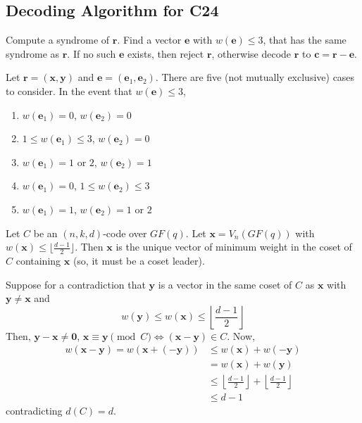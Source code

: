 \subsection*{Decoding Algorithm for C24}
Compute a syndrome of $ \symbf{r} $. Find a vector $ \symbf{e} $ with $ w(\symbf{e})\leqslant 3 $,
that has the same syndrome as $ \symbf{r} $. If no such $ \symbf{e} $ exists, then
reject $ \symbf{r} $, otherwise decode $ \symbf{r} $ to $ \symbf{c}=\symbf{r}-\symbf{e} $.

Let $ \symbf{r}=(\symbf{x},\symbf{y}) $ and $ \symbf{e}=(\symbf{e}_1,\symbf{e}_2) $.
There are five (not mutually exclusive) cases to consider. In the event that
$ w(\symbf{e})\leqslant 3 $,
\begin{enumerate}[label=(\Alph*)]
    \item $ w(\symbf{e}_1)=0 $, $ w(\symbf{e}_2)=0 $
    \item $ 1\leqslant w(\symbf{e}_1)\leqslant 3 $, $ w(\symbf{e}_2)=0 $
    \item $ w(\symbf{e}_1)=1 $ or $ 2 $, $ w(\symbf{e}_2)=1 $
    \item $ w(\symbf{e}_1)=0 $, $ 1\leqslant w(\symbf{e}_2)\leqslant 3 $
    \item $ w(\symbf{e}_1)=1 $, $ w(\symbf{e}_2)=1 $ or $ 2 $
\end{enumerate}

\begin{Theorem}{}{}
    Let $ C $ be an $ (n,k,d) $-code over $ GF(q) $. Let $ \symbf{x}=
        V_n(GF(q)) $ with $ w(\symbf{x})\leqslant \lfloor \frac{d-1}{2} \rfloor $.
    Then $ \symbf{x} $ is the unique vector of minimum weight in the coset
    of $ C $ containing $ \symbf{x} $ (so, it must be a coset leader).
\end{Theorem}

\begin{Proof}{}{}
    Suppose for a contradiction that
    $ \symbf{y} $ is a vector in the same coset of $ C $ as $ \symbf{x} $
    with $ \symbf{y}\neq \symbf{x} $ and
    \[ w(\symbf{y})\leqslant w(\symbf{x})\leqslant \left\lfloor \frac{d-1}{2} \right\rfloor \]
    Then, $ \symbf{y}-\symbf{x}\neq \symbf{0} $, $ \symbf{x}\equiv \symbf{y}\pmod{C} \iff
        (\symbf{x}-\symbf{y})\in C $. Now,
    \begin{align*}
        w(\symbf{x}-\symbf{y})=w(\symbf{x}+(-\symbf{y}))
         & \leqslant w(\symbf{x})+w(-\symbf{y})                                                          \\
         & =w(\symbf{x})+w(\symbf{y})                                                                    \\
         & \leqslant \left\lfloor \frac{d-1}{2} \right\rfloor + \left\lfloor \frac{d-1}{2} \right\rfloor \\
         & \leqslant d-1
    \end{align*}
    contradicting $ d(C)=d $.
\end{Proof}
